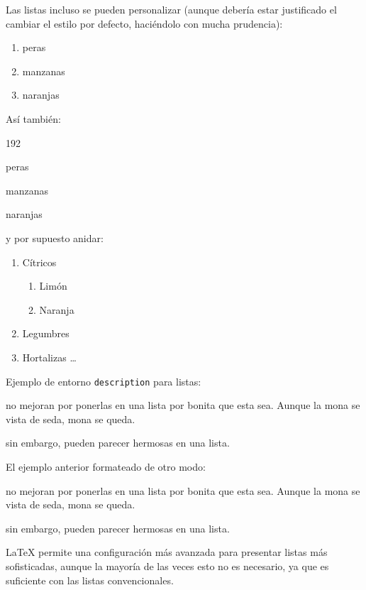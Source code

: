 \documentclass[11pt,a4paper]{article}
\begin{document}
\noindent Las listas incluso se pueden personalizar (aunque debería estar justificado el cambiar el estilo por defecto, haciéndolo con mucha prudencia):

\begin{enumerate} %
	\item peras
	\item[\ding{55}] manzanas
	\item naranjas
\end{enumerate}


\noindent Así también:

\begin{dingautolist}{192} %
	\item peras
	\item manzanas
	\item naranjas
\end{dingautolist}


\noindent y por supuesto anidar:

\begin{enumerate}
  \item Cítricos
  \begin{enumerate}
    \item Limón
    \item Naranja
  \end{enumerate}
  \item Legumbres
  \item Hortalizas \ldots
\end{enumerate}


\noindent Ejemplo de entorno {\tt description} para listas:

\begin{description}[noitemsep]
	\item[Estupideces] no mejoran por ponerlas en una lista por bonita que esta sea. Aunque la mona se vista de seda, mona se queda.
	\item[Lucideces] sin embargo, pueden parecer hermosas en
	una lista.
\end{description}

\noindent El ejemplo anterior formateado de otro modo:

\begin{description}[style=nextline]
	\item[Estupideces] no mejoran por ponerlas en una lista por bonita que esta sea. Aunque la mona se vista de seda, mona se queda.
	\item[Lucideces] sin embargo, pueden parecer hermosas en una lista.
\end{description}

\LaTeX{} permite una configuración más avanzada para presentar listas más sofisticadas, aunque la mayoría de las veces esto no es necesario, ya que es suficiente con las listas convencionales.
\end{document}
